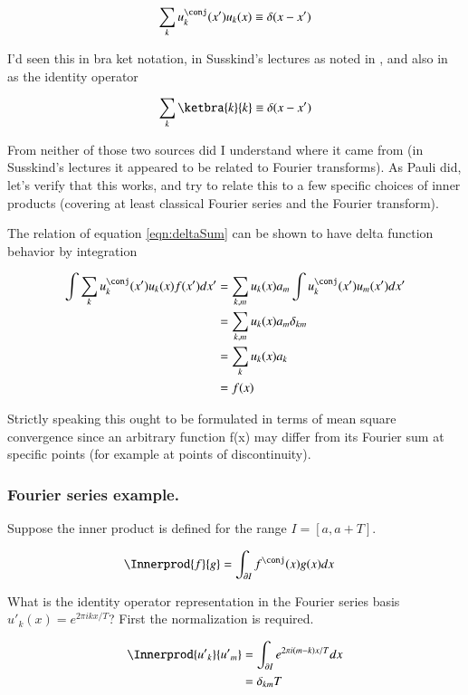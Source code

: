 \begin{align}\label{eqn:deltaSum}
\sum_{k} u_k^\conj(x') u_k(x) \equiv \delta(x-x') 
\end{align}

I'd seen this in bra ket notation, in Susskind's lectures as noted in \cite{PJQmSusskind}, and also in \cite{mcmahon2005qmd} as the
identity operator

\begin{align}
\sum_{k} \ketbra{k}{k} \equiv \delta(x-x') 
\end{align}

From neither of those two sources did I understand where it came from (in Susskind's lectures it appeared to be
related to Fourier transforms).
As Pauli did, let's verify that this works, and try to relate this to a few specific choices of inner products (covering at
least classical Fourier series and the Fourier transform).

The relation of equation \ref{eqn:deltaSum} can be shown to have delta function behavior by integration

\begin{align*}
\int \sum_{k} u_k^\conj(x') u_k(x) f(x') dx'
&=
\sum_{k,m} u_k(x) a_m \int u_k^\conj(x') u_m(x') dx' \\
&=
\sum_{k,m} u_k(x) a_m \delta_{km} \\
&=
\sum_{k} u_k(x) a_k \\
&=
f(x) 
\end{align*}

Strictly speaking this ought to be formulated in terms of mean square convergence since an arbitrary function f(x) 
may differ from its Fourier sum at specific points (for example at points of discontinuity).

\subsubsection{Fourier series example. }

Suppose the inner product is defined for the range $I = [a, a+T]$.

\begin{align*}
\Innerprod{f}{g} &= \int_{\partial I} f^\conj(x) g(x) dx
\end{align*}

What is the identity operator representation in the Fourier series basis ${u'}_k(x) = e^{ 2 \pi i k x / T}$?  First the 
normalization is required.

\begin{align*}
\Innerprod{{u'}_k}{{u'}_m} 
&= \int_{\partial I} e^{ 2 \pi i (m-k) x /T } dx  \\
&= \delta_{km} T
\end{align*}


